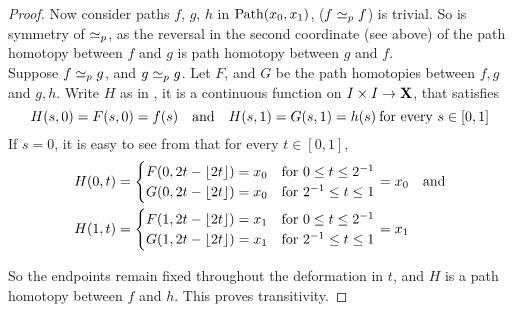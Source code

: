 \documentclass[../main-manifolds.tex]{subfiles}
\begin{document}
\begin{proof}
    Now consider paths $f$, $g$, $h$ in $\Path[x_0,x_1]$, ($f\simeq_p f$) is trivial. So is symmetry of $\simeq_p$, as the reversal in the second coordinate (see above) of the path homotopy between $f$ and $g$ is path homotopy between $g$ and $f$.\\

    Suppose $f\simeq_p g$, and $g\simeq_p g$. Let $F$, and $G$ be the path homotopies between $f,g$ and $g,h$. Write $H$ as in , it is a continuous function on $I\times I\to {\mathbf{X}}$, that satisfies
    \[
        H(s,0) = F(s,0) = f(s)\qqtext{and} H(s,1)=G(s,1)=h(s)\: \text{for every }s\in[0,1]
    \]
    If $s=0$, it is easy to see from  that for every $t\in[0,1]$, 
    \begin{align*}
        H(0,t)&=\begin{cases}
            F(0,2t-\lfloor2t\rfloor)=x_0 & \text{for } 0\leq t\leq 2^{-1}\\
            G(0,2t-\lfloor2t\rfloor)=x_0 & \text{for } 2^{-1}\leq t\leq 1\\
        \end{cases}=x_0\quad \text{and}\\
        H(1,t)&=\begin{cases}
            F(1,2t-\lfloor2t\rfloor)=x_1 & \text{for } 0\leq t\leq 2^{-1}\\
            G(1,2t-\lfloor2t\rfloor)=x_1 & \text{for } 2^{-1}\leq t\leq 1\\
        \end{cases}=x_1
    \end{align*}

    So the endpoints remain fixed throughout the deformation in $t$, and $H$ is a path homotopy between $f$ and $h$. This proves transitivity.
\end{proof}

\end{document}

